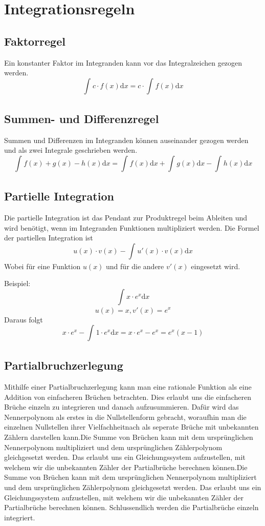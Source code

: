 \documentclass{article}
\author{Philipp Kiss}
\begin{document}
\section{Integrationsregeln}
\subsection{Faktorregel}
Ein konstanter Faktor im Integranden kann vor das Integralzeichen gezogen werden.
$$ \int_{}^{} c \cdot f(x) \mathrm{d}x = c \cdot \int_{}^{} f(x) \mathrm{d}x $$
\subsection{Summen- und Differenzregel}
Summen und Differenzen im Integranden können auseinander gezogen werden und als zwei Integrale geschrieben werden.
$$ \int_{}^{} f(x) + g(x) - h(x) \mathrm{d}x = \int_{}^{} f(x) \mathrm{d}x + \int_{}^{} g(x) \mathrm{d}x - \int_{}^{} h(x) \mathrm{d}x $$

\subsection{Partielle Integration}
Die partielle Integration ist das Pendant zur Produktregel beim Ableiten und wird benötigt, wenn im Integranden Funktionen multipliziert werden. Die Formel der partiellen Integration ist
$$u(x) \cdot v(x) - \int_{}^{} u'(x) \cdot v(x) \mathrm{d}x $$
Wobei für eine Funktion $u(x)$ und für die andere $v'(x)$ eingesetzt wird.

Beispiel:
$$ \int_{}^{} x \cdot e^{x} \mathrm{d}x $$
$$u(x) = x, v'(x) = e^{x}$$
Daraus folgt
$$x \cdot e^{x} - \int_{}^{} 1 \cdot e^{x} \mathrm{d}x = x \cdot e^{x} - e^{x} = e^{x}(x-1)$$

\subsection{Partialbruchzerlegung}
Mithilfe einer Partialbruchzerlegung kann man eine rationale Funktion als eine Addition von einfacheren Brüchen betrachten. Dies erlaubt uns die einfacheren Brüche einzeln zu integrieren und danach aufzusummieren. Dafür wird das Nennerpolynom als erstes in die Nullstellenform gebracht, woraufhin man die einzelnen Nullstellen ihrer Vielfachheitnach als seperate Brüche mit unbekannten Zählern darstellen kann.Die Summe von Brüchen kann mit dem ursprünglichen Nennerpolynom multipliziert und dem ursprünglichen Zählerpolynom gleichgesetzt werden. Das erlaubt uns ein Gleichungssystem aufzustellen, mit welchem wir die unbekannten Zähler der Partialbrüche berechnen können.Die Summe von Brüchen kann mit dem ursprünglichen Nennerpolynom multipliziert und dem ursprünglichen Zählerpolynom gleichgesetzt werden. Das erlaubt uns ein Gleichungssystem aufzustellen, mit welchem wir die unbekannten Zähler der Partialbrüche berechnen können. Schlussendlich werden die Partialbrüche einzeln integriert.
\end{document}
